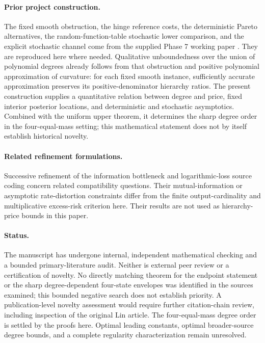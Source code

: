 \documentclass[11pt]{article}
\theoremstyle{definition}\newtheorem{definition}[theorem]{Definition}
\theoremstyle{remark}\newtheorem{remark}[theorem]{Remark}
\begin{document}
\paragraph{Prior project construction.}
The fixed smooth obstruction, the hinge reference costs, the deterministic Pareto alternatives, the random-function-table stochastic lower comparison, and the explicit stochastic channel come from the supplied Phase 7 working paper \cite[Section 4]{huang7}. They are reproduced here where needed. Qualitative unboundedness over the union of polynomial degrees already follows from that obstruction and positive polynomial approximation of curvature: for each fixed smooth instance, sufficiently accurate approximation preserves its positive-denominator hierarchy ratios. The present construction supplies a quantitative relation between degree and price, fixed interior posterior locations, and deterministic and stochastic asymptotics. Combined with the uniform upper theorem, it determines the sharp degree order in the four-equal-mass setting; this mathematical statement does not by itself establish historical novelty.

\paragraph{Related refinement formulations.}
Successive refinement of the information bottleneck \cite{charvin} and logarithmic-loss source coding \cite{no} concern related compatibility questions. Their mutual-information or asymptotic rate-distortion constraints differ from the finite output-cardinality and multiplicative excess-risk criterion here. Their results are not used as hierarchy-price bounds in this paper.

\paragraph{Status.}
The manuscript has undergone internal, independent mathematical checking and a bounded primary-literature audit. Neither is external peer review or a certification of novelty. No directly matching theorem for the endpoint statement or the sharp degree-dependent four-state envelopes was identified in the sources examined; this bounded negative search does not establish priority. A publication-level novelty assessment would require further citation-chain review, including inspection of the original Lin article. The four-equal-mass degree order is settled by the proofs here. Optimal leading constants, optimal broader-source degree bounds, and a complete regularity characterization remain unresolved.
\end{document}
